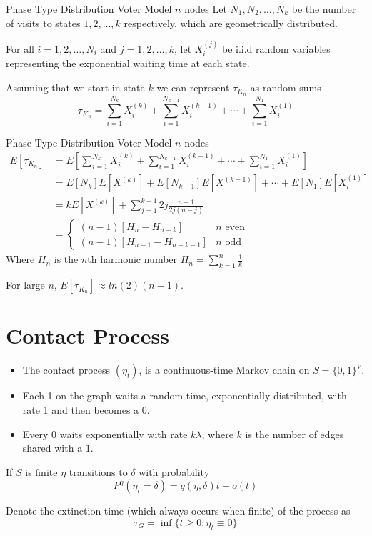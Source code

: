 \documentclass{beamer}
\theoremstyle{definition}
\begin{document}
\begin{frame}{Phase Type Distribution Voter Model $n$ nodes}
   Let $N_1, N_2, \ldots, N_k$ be the number of visits to states $1, 2, \ldots, k$ respectively, which are geometrically distributed.

For all $i = 1,2,\ldots, N_i$ and $j = 1,2,\ldots, k$, let $X_i^{(j)}$ be i.i.d random variables representing the exponential waiting time at each state.

Assuming that we start in state $k$ we can represent $\tau_{K_n}$ as random sums
$$
    \tau_{K_n} = \sum_{i = 1}^{N_k} X_i^{(k)} + \sum_{i = 1}^{N_{k - 1}} X_i^{(k - 1)} + \cdots + \sum_{i = 1}^{N_1} X_i^{(1)}
$$
\end{frame}

\begin{frame}{Phase Type Distribution Voter Model $n$ nodes}
    \begin{align*}
    E[\tau_{K_n}] &= E\left[\sum_{i = 1}^{N_k} X_i^{(k)} + \sum_{i = 1}^{N_{k - 1}} X_i^{(k - 1)} + \cdots + \sum_{i = 1}^{N_1} X_i^{(1)}\right]\\
    &= E[N_k] E[X^{(k)}] + E[N_{k - 1}] E[X^{(k - 1)}] + \cdots + E[N_1]E[X_i^{(1)}]\\
    &= k E[X^{(k)}] + \sum_{j = 1}^{k - 1} 2j \frac{n - 1}{2j (n - j)}\\
    &= \begin{cases}
    (n - 1) \left[H_{n} - H_{n - k}\right] & n \text{ even}\\
    (n - 1) \left[H_{n - 1} - H_{n - k - 1}\right] & n \text{ odd}
    \end{cases}
    \end{align*}
Where $H_n$ is the $n$th harmonic number $H_n = \sum_{k = 1}^n \frac{1}{k}$

For large $n$, $E[\tau_{K_n}] \approx ln(2) (n - 1)$.
\end{frame}


\section{Contact Process}

\begin{frame}
\begin{itemize}
    \item The contact process $(\eta_t)$, is a continuous-time Markov chain on $S = \{0,1\}^V$.
    \item Each 1 on the graph waits a random time, exponentially distributed, with rate 1 and then becomes a 0.
    \item Every 0 waits exponentially with rate $k \lambda$, where $k$ is the number of edges shared with a 1.
\end{itemize}

If $S$ is finite $\eta$ transitions to $\delta$ with probability
$$
P^\eta(\eta_t = \delta) = q(\eta, \delta) t + o(t)
$$

Denote the extinction time (which always occurs when finite) of the process as
$$
\tau_{G} = \inf\{ t \geq 0 : \eta_t \equiv 0 \}
$$
\end{frame}
\end{document}
